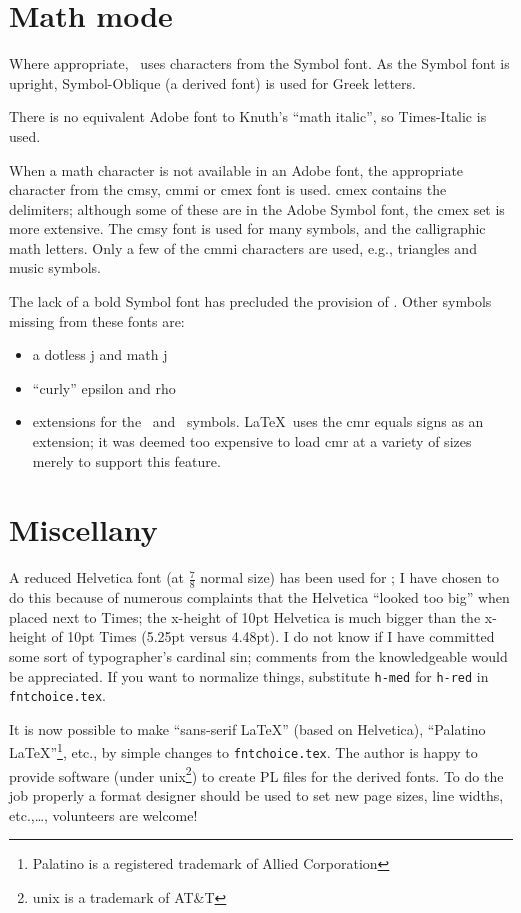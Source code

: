 \section{Math mode}

Where appropriate, \pslatex\ uses characters from the Symbol font.  As
the Symbol font is upright, Symbol-Oblique (a derived font) is used
for Greek letters.

There is no equivalent Adobe font to Knuth's ``math italic'', so
Times-Italic is used.

When a math character is not available in an Adobe font, the
appropriate character from the {\sc cmsy}, {\sc cmmi} or {\sc cmex}
font is used.  {\sc cmex} contains the delimiters; although some of
these are in the Adobe Symbol font, the {\sc cmex} set is more
extensive.  The {\sc cmsy} font is used for many symbols, and the
calligraphic math letters.  Only a few of the {\sc cmmi} characters
are used, e.g., triangles and music symbols.  

The lack of a bold Symbol font has precluded the provision of \cs\boldmath.
Other symbols missing from these fonts are: 
\begin{itemize}
\item	a dotless j and math j
\item	``curly'' epsilon and rho
\item	extensions for the \cs\Leftarrow\ and \cs\Rightarrow\ symbols.
	\LaTeX\ uses the {\sc cmr} equals signs as an extension; it
	was deemed too expensive to load {\sc cmr} at a variety of
	sizes merely to support this feature.
\end{itemize}

\section{Miscellany}

A reduced Helvetica font (at $\frac78$ normal size) has been used for
\cs\sf; I have chosen to do this because of numerous complaints that
the Helvetica ``looked too big'' when placed next to Times; the
x-height of 10pt Helvetica is much bigger than the x-height of 10pt
Times (5.25pt versus 4.48pt).  I do not know if I have committed some
sort of typographer's cardinal sin; comments from the knowledgeable
would be appreciated.  If you want to normalize things, substitute
{\tt h-med} for {\tt h-red} in {\tt fntchoice.tex}.

It is now possible to make ``sans-serif \LaTeX'' (based on Helvetica),
``Palatino \LaTeX''\footnote{Palatino is a registered trademark of
Allied Corporation}, etc., by simple changes to {\tt fntchoice.tex}.  The
author is happy to provide software (under {\sc unix}\footnote{{\sc
unix} is a trademark of AT\&T}) to create PL files for the derived
fonts.  To do the job properly a format designer should be used to set
new page sizes, line widths, etc.,\ldots, volunteers are welcome!

